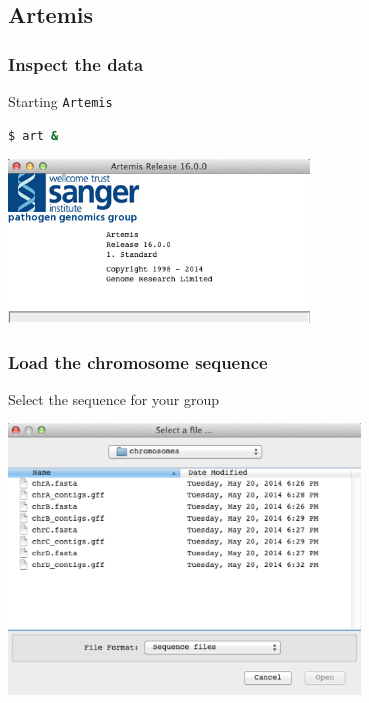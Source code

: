 \documentclass[table]{beamer}
\begin{document}
  \subsection{Artemis}
  \begin{frame}[fragile]
    \frametitle{Inspect the data}
    Starting \texttt{Artemis}
\begin{lstlisting}[language=bash]
$ art &
\end{lstlisting}
    \begin{center}
      \includegraphics[width=0.6\textwidth]{images/artemis_splash} 
    \end{center}
\end{frame}
    
  \begin{frame}
    \frametitle{Load the chromosome sequence}
    Select the sequence for your group
    \begin{center}
      \includegraphics[width=0.7\textwidth]{images/artemis_files} 
    \end{center}
\end{frame}
    
\end{document}
